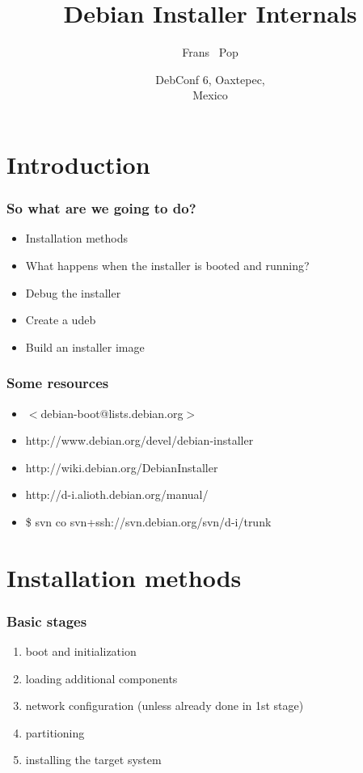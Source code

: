 \documentclass{beamer}
\title
{Debian Installer Internals}
\author
{Frans ~Pop}
\date[Debconf 6] %
{DebConf 6, Oaxtepec,\\ Mexico}
\begin{document}
\begin{frame}
  \titlepage
\end{frame}

\begin{frame}
  \tableofcontents
\end{frame}


\section{Introduction}

\begin{frame}
  \frametitle{So what are we going to do?}
	\begin{itemize}
	\item
		Installation methods
	\item
		What happens when the installer is booted and running?
	\item
		Debug the installer
	\item
		Create a udeb
	\item
		Build an installer image
	\end{itemize}
\end{frame}

\begin{frame}
  \frametitle{Some resources}
	\begin{itemize}
	\item
		$<$debian-boot@lists.debian.org$>$
	\item
		http://www.debian.org/devel/debian-installer
	\item
		http://wiki.debian.org/DebianInstaller
	\item
		http://d-i.alioth.debian.org/manual/
	\item
		\$ svn co svn+ssh://svn.debian.org/svn/d-i/trunk
	\end{itemize}
\end{frame}

\section{Installation methods}

\begin{frame}
  \frametitle{Basic stages}
	\begin{enumerate}
	\item
		boot and initialization
	\item
		loading additional components
	\item
		network configuration (unless already done in 1st stage)
	\item
		partitioning
	\item
		installing the target system
	\end{enumerate}
\end{frame}
\end{document}
